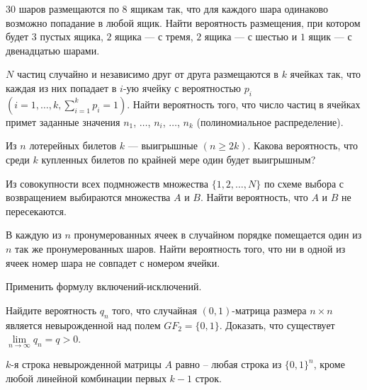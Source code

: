 \begin{problem}
$30$ шаров размещаются по $8$ ящикам так, что для каждого шара одинаково возможно попадание в любой ящик. Найти вероятность 
размещения, при котором будет $3$ пустых ящика, $2$ ящика --- с тремя, $2$ ящика --- с шестью и $1$ ящик --- с двенадцатью шарами. 
\end{problem}


\begin{problem}
$N$ частиц случайно и независимо друг от друга размещаются в $k$ ячейках так, что каждая из них попадает 
в $i$-ую ячейку с вероятностью $p_i$ $(i=1,\ldots,k, \sum\limits_{i=1}^{k} p_i=1)$. Найти вероятность того, что число частиц в ячейках 
примет заданные значения $n_1$, $\ldots$, $n_i$, $\ldots$, $n_k$ (полиномиальное распределение). 
\end{problem}

\begin{problem}
Из $n$ лотерейных билетов $k$ --- выигрышные $(n\geqslant 2k)$. Какова вероятность, что среди $k$ купленных билетов по крайней мере 
один будет выигрышным? 
\end{problem}

\begin{problem}
Из совокупности всех подмножеств множества $\{1,2,\ldots,N\}$ по схеме выбора с возвращением выбираются множества $A$ и $B$. 
Найти вероятность, что $A$ и $B$ не пересекаются. 
\end{problem}


\begin{problem}
В каждую из $n$ пронумерованных ячеек в случайном порядке помещается один из $n$ так же пронумерованных шаров. 
Найти вероятность того, что ни в одной из ячеек номер шара не совпадет с номером ячейки. 

\begin{ordre}
Применить формулу включений-исключений.
\end{ordre}
\end{problem}

\begin{problem} 
Найдите вероятность $q_n$ того, что случайная $(0,1)$-матрица размера $n\times n$ является невырожденной над полем 
$GF_2=\{ 0,1\}$. Доказать, что существует $\lim\limits_{n\to\infty} q_n=q>0$. 
\end{problem}

\begin{ordre}
$k$-я строка невырожденной матрицы $A$ равно -- любая строка из $\{ 0,1\}^n$, 
кроме любой линейной комбинации первых $k-1$ строк. 
\end{ordre}

